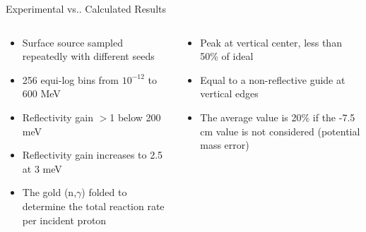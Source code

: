 \documentclass[final,t]{beamer}
\makeatletter
\DeclareRobustCommand\onedot{\futurelet\@let@token\@onedot}
\def\@onedot{\ifx\@let@token.\else.\null\fi\xspace}
\def\vs{{vs}\onedot}
\makeatother
\begin{document}
\begin{frame}{}
\begin{columns}[t]
\begin{column}{.3\linewidth}
\begin{block}{Experimental \vs Calculated Results}
\begin{columns}
\begin{column}{0.5\linewidth}
\begin{center}
      \end{center}
      \end{column}

      \end{columns}




      \begin{columns}

      \begin{column}{0.5\linewidth}

      \begin{itemize}
      \item Surface source sampled repeatedly with different seeds  
      \item 256 equi-log bins from $10^{-12}$ to 600 MeV
      \item Reflectivity gain \alert{$>$1} below 200 meV 
      \item Reflectivity gain increases to \alert{2.5} at 3 meV
      \item The gold (n,$\gamma$) folded to determine the total reaction rate per incident proton
      \end{itemize}

      \end{column}

      \begin{column}{0.5\linewidth}

      \begin{itemize}
      \item Peak at vertical center, less than \alert{50\%} of ideal
      \item Equal to a non-reflective guide at vertical edges
      \item The average value is \alert{20\%} if the -7.5 cm value is not considered (potential mass error)
      \end{itemize}

      \end{column}

      \end{columns}
      
      

      \end{block}


      \vspace{8ex}


\end{column}
\end{columns}
\end{frame}
\end{document}

